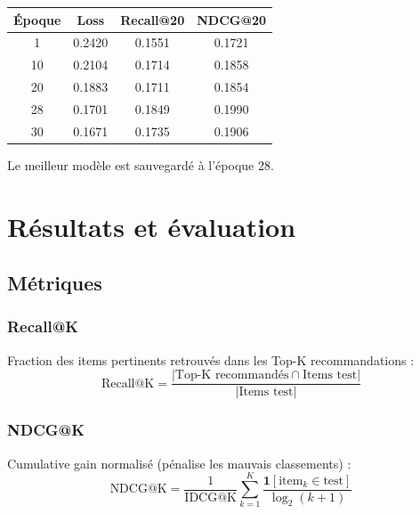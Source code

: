 \documentclass[12pt,a4paper]{report}
\begin{document}
\begin{center}
\begin{tabular}{cccc}
\toprule
\textbf{Époque} & \textbf{Loss} & \textbf{Recall@20} & \textbf{NDCG@20} \\
\midrule
1 & 0.2420 & 0.1551 & 0.1721 \\
10 & 0.2104 & 0.1714 & 0.1858 \\
20 & 0.1883 & 0.1711 & 0.1854 \\
\cellcolor{yellow!30}28 & \cellcolor{yellow!30}0.1701 &
  \cellcolor{yellow!30}0.1849 & \cellcolor{yellow!30}0.1990 \\
30 & 0.1671 & 0.1735 & 0.1906 \\
\bottomrule
\end{tabular}
\end{center}

Le meilleur modèle est sauvegardé à l'époque 28.

\chapter{Résultats et évaluation}

\section{Métriques}

\subsection{Recall@K}

Fraction des items pertinents retrouvés dans les Top-K recommandations :
\begin{equation}
  \text{Recall@K} = \frac{|\text{Top-K recommandés} \cap \text{Items test}|}{|\text{Items test}|}
\end{equation}

\subsection{NDCG@K}

Cumulative gain normalisé (pénalise les mauvais classements) :
\begin{equation}
  \text{NDCG@K} = \frac{1}{\text{IDCG@K}} \sum_{k=1}^{K} \frac{\mathbf{1}[\text{item}_k \in \text{test}]}{\log_2(k+1)}
\end{equation}
\end{document}
